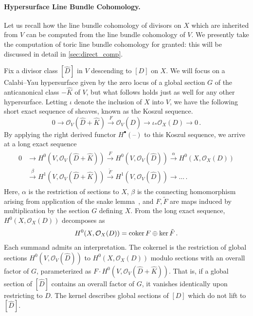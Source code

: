 \documentclass[11pt,dvipsnames]{article}
\theoremstyle{definition}
\begin{document}
\paragraph{Hypersurface Line Bundle Cohomology.} Let us recall how the line bundle cohomology of divisors on $X$ which are inherited from $V$ can be computed from the line bundle cohomology of $V$. We presently take the computation of toric line bundle cohomology for granted: this will be discussed in detail in \cref{sec:direct_comp}.

Fix a divisor class $[\hat{D}]$ in $V$ descending to $[D]$ on $X$. We will focus on a Calabi--Yau hypersurface given by the zero locus of a global section $G$ of the anticanonical class $-\hat{K}$ of $V$, but what follows holds just as well for any other hypersurface. Letting $\iota$ denote the inclusion of $X$ into $V$, we have the following short exact sequence of sheaves, known as the Koszul sequence.
\begin{equation}
    0 \to \mathcal{O}_V(\hat{D}+\hat{K}) \xrightarrow{F} \mathcal{O}_V(\hat{D}) \to \iota_*\mathcal{O}_X(D) \to 0 \, .
\end{equation}
By applying the right derived functor $H^{\bullet}(\text{--})$ to this Koszul sequence, we arrive at a long exact sequence
\begin{align}
    \begin{split}
        0 & \to H^0(V,\mathcal{O}_V(\hat{D} + \hat{K})) \xrightarrow{F} H^0(V, \mathcal{O}_V(\hat{D})) \xrightarrow{\alpha} H^0(X,\mathcal{O}_X(D)) \\
        & \xrightarrow{\beta} H^1(V,\mathcal{O}_V(\hat{D} + \hat{K})) \xrightarrow{\tilde{F}} H^1(V,\mathcal{O}_V(\hat{D})) \to {\dots} \,.
    \end{split}
\end{align}
Here, $\alpha$ is the restriction of sections to $X$, $\beta$ is the connecting homomorphism arising from application of the snake lemma~\cite{weibel1994introduction}, and $F, \tilde{F}$ are maps induced by multiplication by the section $G$ defining $X$. From the long exact sequence, $H^0(X,\mathcal{O}_X(D))$ decomposes as 
\begin{equation}
    \label{eq:coker_ker}
    H^0(X,\mathcal{O}_X(D)) = \mathrm{coker} \, F \oplus \mathrm{ker} \, \Tilde{F} \, .
\end{equation}
Each summand admits an interpretation. The cokernel is the restriction of global sections $H^0(V, \mathcal{O}_V(\hat{D}))$ to $H^0(X,\mathcal{O}_X(D))$ modulo sections with an overall factor of $G$, parameterized as $F \cdot H^0(V,\mathcal{O}_V(\hat{D} + \hat{K}))$. That is, if a global section of $[\hat{D}]$ contains an overall factor of $G$, it vanishes identically upon restricting to $D$. The kernel describes global sections of $[D]$ which do not lift to $[\hat{D}]$.
\end{document}
